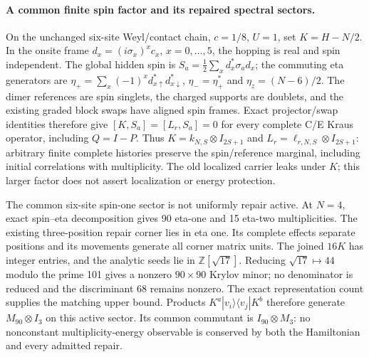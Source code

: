 \paragraph{A common finite spin factor and its repaired spectral sectors.}
On the unchanged six-site Weyl/contact chain, $c=1/8$, $U=1$, set
$K=H-N/2$.  In the onsite frame $d_x=(i\sigma_x)^x c_x$, $x=0,\ldots,5$,
the hopping is real and spin independent.  The global hidden spin is
$S_a=\tfrac12\sum_xd_x^*\sigma_a d_x$; the commuting eta generators are
$\eta_+=\sum_x(-1)^x d_{x\uparrow}^*d_{x\downarrow}^*$,
$\eta_-=\eta_+^*$ and $\eta_z=(N-6)/2$.
The dimer references are spin singlets, the charged supports are doublets,
and the existing graded block swaps have aligned spin frames.  Exact
projector/swap identities therefore give $[K,S_a]=[L_r,S_a]=0$
for every complete C/E Kraus operator, including $Q=I-P$.
Thus $K=k_{N,S}\otimes I_{2S+1}$ and
$L_r=\ell_{r,N,S}\otimes I_{2S+1}$: arbitrary finite complete histories
preserve the spin/reference marginal, including initial correlations
with multiplicity.  The old localized carrier leaks under $K$;
this larger factor does not assert localization or energy protection.

The common six-site spin-one sector is not uniformly repair active.
At $N=4$, exact spin--eta decomposition gives 90 eta-one and 15 eta-two
multiplicities.  The existing three-position repair corner lies in eta
one.  Its complete effects separate positions and its movements generate
all corner matrix units.  The joined $16K$ has integer entries, and the
analytic seeds lie in $\mathbb Z[\sqrt{17}]$.  Reducing
$\sqrt{17}\mapsto44$ modulo the prime 101 gives a nonzero $90\times90$
Krylov minor; no denominator is reduced and the discriminant 68 remains
nonzero.  The exact representation count supplies the matching upper
bound.  Products $K^a|v_i\rangle\langle v_j|K^b$ therefore generate
$M_{90}\otimes I_3$ on this active sector.  Its common commutant is
$I_{90}\otimes M_3$: no nonconstant multiplicity-energy observable is
conserved by both the Hamiltonian and every admitted repair.

